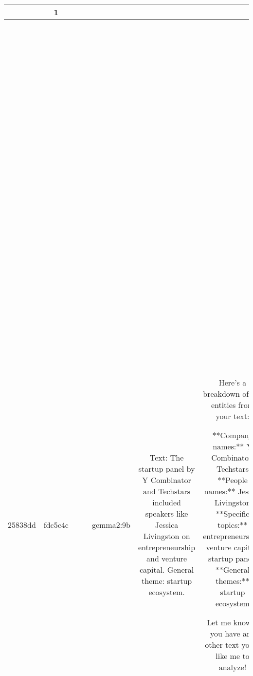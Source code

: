 \begin{table}[h!]
\begin{tabular}{|c|c|c|c|c|c|c|c|c|c|}
{No violation.
OK & 1\\
\hline
25838dd & fdc5c4c &  &  & gemma2:9b & Text: The startup panel by Y Combinator and Techstars included speakers like Jessica Livingston on entrepreneurship and venture capital. General theme: startup ecosystem. & Here's a breakdown of the entities from your text:

**Company names:** Y Combinator, Techstars 
**People names:** Jessica Livingston 
**Specific topics:** entrepreneurship, venture capital, startup panels
**General themes:** startup ecosystem  


Let me know if you have any other text you'd like me to analyze! 
 & err & The output is partially compliant with the description provided. 

1. The format for the extracted elements complies with the "Desired format" in the description. The elements are extracted in four categories: Company names, People names, Specific topics, and General themes.

2. Each category is listed separately and uses comma-separated lists as specified.

3. There is, however, an additional closing statement, "Let me know if you have any other text you'd like me to analyze!" which is not part of the desired output format. This extra wording does not conform to the specified format that strictly outlines the structure expected.

For these reasons, the output contains content outside of the specified desired format, leading to non-compliance with the directives.

ERR & 1\\
\hline
25838dd & fdc5c4c &  &  & qwen2.5:3b & Text: The startup panel by Y Combinator and Techstars included speakers like Jessica Livingston on entrepreneurship and venture capital. General theme: startup ecosystem. & Based on the provided text, here is the structured output in the desired format:

```
Company names: Y Combinator, Techstars

People names: -||-

Specific topics:
- Jessica Livingston (speaker)
- Entrepreneurship
- Venture capital
- Startups
- Startup panel

General themes:
- Startup ecosystem
``` & err & The chatbot output partly follows the prescribed format but not entirely. Here is the evaluation:

1. **Company names**: The chatbot correctly lists company names, with two companies correctly separated by commas.

}
\end{tabular}
\end{table}

